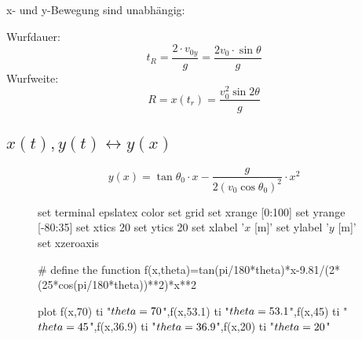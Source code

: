 x- und y-Bewegung sind unabh\"angig:
\newline
\begin{footnotesize}
\end{footnotesize}
\newline
\newline
Wurfdauer:
\[
	\boxed{t_R=\frac{2 \cdot v_{0y}}{g}=\frac{2v_0 \cdot\sin\theta}{g}}
\]
\newline
Wurfweite:
\[
	\boxed{R=x(t_r)=\frac{v_0^2\sin2\theta}{g}}
\]
\newline

\subsection{$x(t),y(t)\leftrightarrow y(x)$}
\[
	\boxed{
		y(x)=\tan\theta_0 \cdot x-\frac{g}{2(v_0\cos\theta_0)^2}\cdot x^2
	}
\]
\newline
\begin{figure}[htbp]
\centering
\begin{gnuplot}[scale=0.62]
	set terminal epslatex color
	set grid
  set xrange [0:100]
	set yrange [-80:35]
	set xtics 20
	set ytics 20
	set xlabel '$x$ [m]'
	set ylabel '$y$ [m]'
	set xzeroaxis
	
  # define the function
  f(x,theta)=tan(pi/180*theta)*x-9.81/(2*(25*cos(pi/180*theta))**2)*x**2

  plot f(x,70) ti "$\\theta=70$",f(x,53.1) ti "$\\theta=53.1$",f(x,45) ti "$\\theta=45$",f(x,36.9) ti "$\\theta=36.9$",f(x,20) ti "$\\theta=20$"
\end{gnuplot}
\end{figure}

